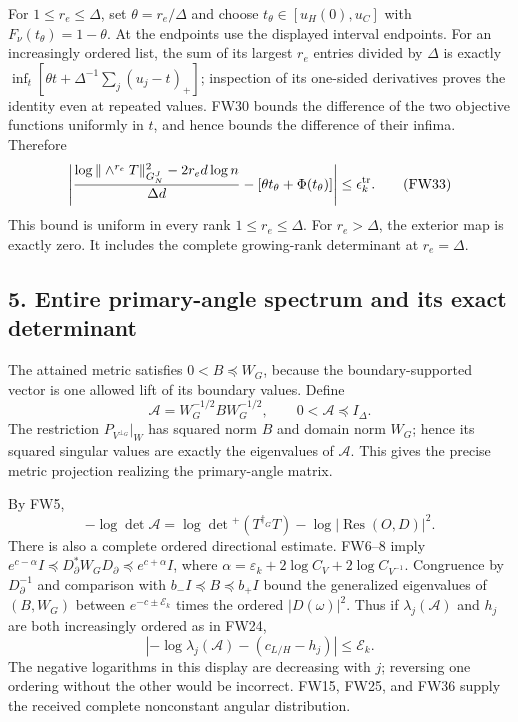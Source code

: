 \documentclass[11pt]{article}
\begin{document}
For \(1\le r_e\le\Delta\), set \(\theta=r_e/\Delta\) and choose \(t_\theta\in[u_H(0),u_C]\) with \(F_\nu(t_\theta)=1-\theta\). At the endpoints use the displayed interval endpoints. For an increasingly ordered list, the sum of its largest \(r_e\) entries divided by \(\Delta\) is exactly \(\inf_t[\theta t+\Delta^{-1}\sum_j(u_j-t)_+]\); inspection of its one-sided derivatives proves the identity even at repeated values. FW30 bounds the difference of the two objective functions uniformly in \(t\), and hence bounds the difference of their infima. Therefore \[
\left|\frac{\log\|\wedge^{r_e}T\|_{G_N^J}^2-2r_ed\log n}{\Delta d}
-[\theta t_\theta+\Phi(t_\theta)]\right|\le\epsilon_k^{\rm tr}.
\tag{FW33}
\] This bound is uniform in every rank \(1\le r_e\le\Delta\). For \(r_e>\Delta\), the exterior map is exactly zero. It includes the complete growing-rank determinant at \(r_e=\Delta\).

\subsection{5. Entire primary-angle spectrum and its exact determinant}\label{entire-primary-angle-spectrum-and-its-exact-determinant}

The attained metric satisfies \(0<B\preceq W_G\), because the boundary-supported vector is one allowed lift of its boundary values. Define \[
\mathcal A=W_G^{-1/2}BW_G^{-1/2},\qquad 0<\mathcal A\preceq I_\Delta.
\tag{FW34}
\] The restriction \(P_{V^{\perp_G}}|_W\) has squared norm \(B\) and domain norm \(W_G\); hence its squared singular values are exactly the eigenvalues of \(\mathcal A\). This gives the precise metric projection realizing the primary-angle matrix.

By FW5, \[
-\log\det\mathcal A=\log\det{}^+(T^{\dagger_G}T)-\log|\operatorname{Res}(O,D)|^2.
\tag{FW35}
\] There is also a complete ordered directional estimate. FW6--8 imply \(e^{c-\alpha}I\preceq D_\partial^*W_GD_\partial\preceq e^{c+\alpha}I\), where \(\alpha=\varepsilon_k+2\log C_V+2\log C_{V^{-1}}\). Congruence by \(D_\partial^{-1}\) and comparison with \(b_-I\preceq B\preceq b_+I\) bound the generalized eigenvalues of \((B,W_G)\) between \(e^{-c\pm\mathcal E_k}\) times the ordered \(|D(\omega)|^2\). Thus if \(\lambda_j(\mathcal A)\) and \(h_j\) are both increasingly ordered as in FW24, \[
\left|-\log\lambda_j(\mathcal A)-(c_{L/H}-h_j)\right|\le\mathcal E_k.
\tag{FW36}
\] The negative logarithms in this display are decreasing with \(j\); reversing one ordering without the other would be incorrect. FW15, FW25, and FW36 supply the received complete nonconstant angular distribution.
\end{document}
